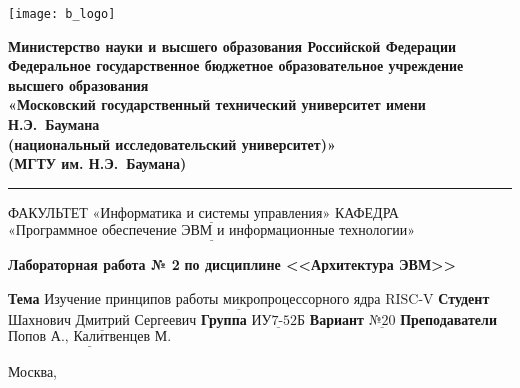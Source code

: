 \thispagestyle{empty}

\noindent \begin{minipage}{0.15\textwidth}
	\texttt{[image: b\_logo]}
\end{minipage}
\noindent\begin{minipage}{0.85\textwidth}\centering
	\textbf{Министерство науки и высшего образования Российской Федерации}\\
	\textbf{Федеральное государственное бюджетное образовательное учреждение высшего образования}\\
	\textbf{«Московский государственный технический университет имени Н.Э.~Баумана}\\
	\textbf{(национальный исследовательский университет)»}\\
	\textbf{(МГТУ им. Н.Э.~Баумана)}
\end{minipage}

\noindent\rule{\linewidth}{3pt}
\newline\newline
\noindent ФАКУЛЬТЕТ $\underline{\text{«Информатика и системы управления»}}$ \newline\newline
\noindent КАФЕДРА $\underline{\text{«Программное обеспечение ЭВМ и информационные технологии»}}$

\vspace{1cm}

\begin{minipage}{\textwidth}
	\centering
	\Large\textbf{Лабораторная работа № 2}\newline
	\textbf{по дисциплине <<Архитектура ЭВМ>>}\newline\newline
\end{minipage}

\noindent\textbf{Тема} $\underline{\text{Изучение принципов работы микропроцессорного ядра RISC-V}}$\newline\newline
\noindent\textbf{Студент} $\underline{\text{Шахнович Дмитрий Сергеевич}}$\newline\newline
\noindent\textbf{Группа} $\underline{\text{ИУ7-52Б}}$\newline\newline
\noindent\textbf{Вариант} $\underline{\text{№20}}$\newline\newline
\noindent\textbf{Преподаватели} $\underline{\text{Попов А., Калитвенцев М.}}$\newline

\begin{center}
	\vfill
	Москва,~\the\year
\end{center}
\clearpage
